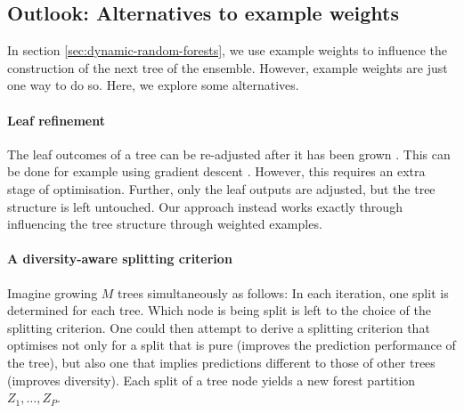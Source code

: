 \documentclass[
    a4paper, %
	fontsize=10pt, %
	twoside=false, %
]{kaobook}
\begin{document}






\subsection{Outlook: Alternatives to example weights}
In section \ref{sec:dynamic-random-forests}, we use example weights to influence the construction of the next tree of the ensemble. However, example weights are just one way to do so. Here, we explore some alternatives.

\paragraph{Leaf refinement} The leaf outcomes of a tree can be re-adjusted after it has been grown \cite{others}. This can be done for example using gradient descent \cite{buschj-negative-correlation-forests}. However, this requires an extra stage of optimisation. Further, only the leaf outputs are adjusted, but the tree structure is left untouched. Our approach instead works exactly through influencing the tree structure through weighted examples.

\paragraph{A diversity-aware splitting criterion} Imagine growing $M$ trees simultaneously as follows: In each iteration, one split is determined for each tree. Which node is being split is left to the choice of the splitting criterion. 
One could then attempt to derive a splitting criterion that optimises not only for a split that is pure (improves the prediction performance of the tree), but also one that implies predictions different to those of other trees (improves diversity). Each split of a tree node yields a new forest partition $Z_{1}, \dots, Z_{P}$. 
\end{document}
